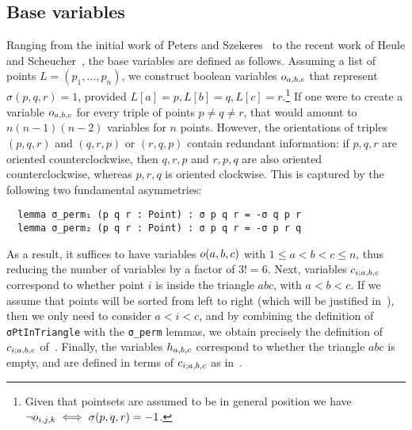 \subsection{Base variables}
Ranging from the initial work of Peters and Szekeres~\cite{szekeres_peters_2006} to the recent work of Heule and Scheucher~\cite{emptyHexagonNumber}, the base variables are defined as follows. Assuming a list of points $L = (p_1, \ldots, p_n)$,
we construct boolean variables $\orvar_{a, b, c}$ that represent $\sigma(p, q, r) = 1$, provided $L[a] = p, L[b] = q, L[c] =r$.\footnote{Given that pointsets are assumed to be in general position we have $\neg \orvar_{i,j,k} \iff \sigma(p, q, r) = -1$.} If one were to create a variable $\orvar_{a,b,c}$ for every triple of points $p \neq q \neq r$, that would amount to $n(n-1)(n-2)$ variables for $n$ points. However, the orientations of triples $(p, q, r)$ and $(q, r, p)$ or $(r, q, p)$ contain redundant information: if $p,q,r$ are oriented counterclockwise, then $q,r,p$ and $r,p,q$ are also oriented counterclockwise, whereas $p,r,q$ is oriented clockwise. This is captured by the following two fundamental asymmetries:
\begin{lstlisting}
  lemma σ_perm₁ (p q r : Point) : σ p q r = -σ q p r
  lemma σ_perm₂ (p q r : Point) : σ p q r = -σ p r q
\end{lstlisting}
As a result, it suffices to have variables $\orvar(a, b, c)$ with $1 \leq a < b < c \leq n$, thus reducing the number of variables by a factor of $3! = 6$.
Next, variables $\cvar_{i;a,b,c}$ correspond to whether point $i$ is inside the triangle $abc$, with $a < b < c$.
If we assume that points will be sorted from left to right (which will be justified in~), then we only need to consider $a < i < c$,
and by combining the definition of \lstinline|σPtInTriangle| with the \lstinline|σ_perm| lemmas, we obtain precisely the definition of $\cvar_{i;a,b,c}$ of~.
Finally, the variables $\hvar_{a, b, c}$ correspond to whether the triangle $abc$ is empty, and are defined in terms of $\cvar_{i;a,b,c}$ as in~.






